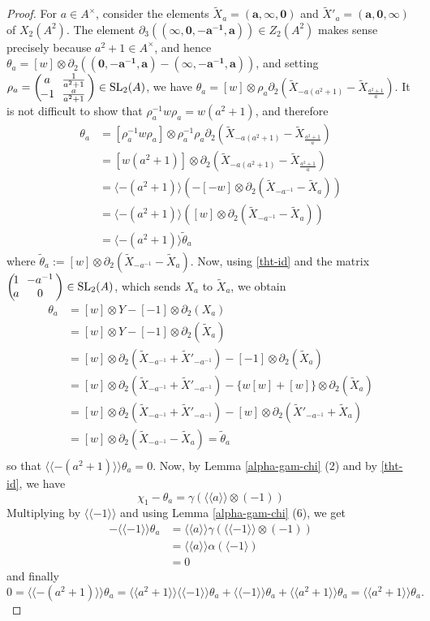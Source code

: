 \documentclass[11pt]{amsart}
\theoremstyle{definition}
\theoremstyle{plain}
\theoremstyle{definition}
\numberwithin{equation}{section}
\renewcommand{\aa}{{A^\times}}
\newcommand{\lan}{\langle}
\newcommand{\ran}{\rangle}
\newcommand{\Lan}{\langle \! \langle}
\newcommand{\Ran}{\rangle \! \rangle}
\newcommand{\SL}{\mathit{{\rm SL}}}
\newcommand{\mtxx}[4]
{\left(\!\!
	\begin{array}{cc}
		\!\!#1 & \!\!#2\\
		\!\!#3 & \!\!#4
	\end{array}\!\!
	\right)}
\begin{document}
	\begin{proof}
		For $a\in\aa$, consider the elements $\tilde{X}_a=(\pmb{a},\pmb{\infty},\pmb{0})$ and $\tilde{X}'_a=(\pmb{a},\pmb{0},\pmb{\infty})$ of $X_2(A^2)$. The element $\partial_3((\pmb{\infty},\pmb{0},\pmb{-a^{-1}},\pmb{a}))\in Z_2(A^2)$ makes sense precisely because $a^2+1\in\aa$, and hence $\theta_a=[w]\otimes\partial_2((\pmb{0},\pmb{-a^{-1}},\pmb{a})-(\pmb{\infty},\pmb{-a^{-1}},\pmb{a}))$, and setting $\rho_a=\mtxx{a}{\frac{1}{a^2+1}}{-1}{\frac{a}{a^2+1}}\in\SL_2(A)$, we have $\theta_a=[w]\otimes\rho_a\partial_2(\tilde{X}_{-a(a^2+1)}-\tilde{X}_{\frac{a^2+1}{a}})$. It is not difficult to show that $\rho_a^{-1}w\rho_a=w(a^2+1)$, and therefore
		\begin{align*}
			\theta_a&=[\rho_a^{-1}w\rho_a]\otimes\rho_a^{-1}\rho_a\partial_2(\tilde{X}_{-a(a^2+1)}-\tilde{X}_{\frac{a^2+1}{a}})\\
			&=[w(a^2+1)]\otimes\partial_2(\tilde{X}_{-a(a^2+1)}-\tilde{X}_{\frac{a^2+1}{a}})\\
			&=\lan -(a^2+1)\ran(-[-w]\otimes\partial_2(\tilde{X}_{-a^{-1}}-\tilde{X}_{a}))\\
			&=\lan -(a^2+1)\ran ([w]\otimes\partial_2(\tilde{X}_{-a^{-1}}-\tilde{X}_a))\\
			&=\lan-(a^2+1)\ran\tilde{\theta}_a
		\end{align*}
		where $\tilde{\theta}_a:=[w]\otimes\partial_2(\tilde{X}_{-a^{-1}}-\tilde{X}_a)$. Now, using \eqref{tht-id} and the matrix $\mtxx{1}{-a^{-1}}{a}{0}\in\SL_2(A)$, which sends $X_a$ to $\tilde{X}_a$, we obtain
		\begin{align*}
			\theta_a&=[w]\otimes Y-[-1]\otimes\partial_2(X_a)\\
			&=[w]\otimes Y-[-1]\otimes\partial_2(\tilde{X}_a)\\
			&=[w]\otimes\partial_2(\tilde{X}_{-a^{-1}}+\tilde{X}'_{-a^{-1}})-[-1]\otimes\partial_2(\tilde{X}_a)\\
			&=[w]\otimes\partial_2(\tilde{X}_{-a^{-1}}+\tilde{X}'_{-a^{-1}})-\{w[w]+[w]\}\otimes\partial_2(\tilde{X}_a)\\
			&=[w]\otimes\partial_2(\tilde{X}_{-a^{-1}}+\tilde{X}'_{-a^{-1}})-[w]\otimes\partial_2(\tilde{X}'_{-a^{-1}}+\tilde{X}_a)\\
			&=[w]\otimes\partial_2(\tilde{X}_{-a^{-1}}-\tilde{X}_a)=\tilde{\theta}_a\\
		\end{align*}
		so that $\Lan-(a^2+1)\Ran\theta_a=0$.
		Now, by Lemma \ref{alpha-gam-chi} (2) and by \eqref{tht-id}, we have
		\[
		\chi_1-\theta_a=\gamma(\Lan a\Ran\otimes(-1))
		\]
		Multiplying by $\Lan -1\Ran$ and using Lemma \ref{alpha-gam-chi} (6), we get
		\begin{align*}
			-\Lan -1\Ran\theta_a&=\Lan a\Ran\gamma(\Lan -1\Ran\otimes(-1))\\
			&=\Lan a\Ran\alpha(\lan -1\ran)\\
			&=0
		\end{align*}
		and finally
		\[
		0=\Lan -(a^2+1)\Ran\theta_a=\Lan a^2+1\Ran\Lan -1\Ran\theta_a+\Lan -1\Ran\theta_a+\Lan a^2+1\Ran\theta_a=\Lan a^2+1\Ran\theta_a.
		\]
	\end{proof}
\end{document}
